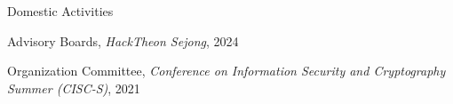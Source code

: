 \documentclass[11pt,letterpaper]{article}
\begin{document}
\begin{topic}{Domestic Activities}{}
  \item{Advisory Boards, \emph{HackTheon Sejong}, 2024} %
  \item{Organization Committee, \emph{Conference on Information Security and Cryptography Summer (CISC-S)}, 2021} %
\end{topic}


\end{document}
